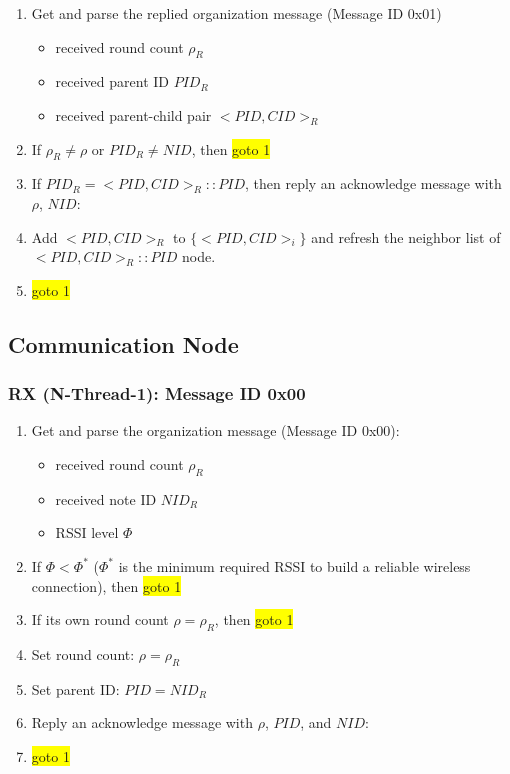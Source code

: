 \documentclass[letterpaper,9pt]{article}
\begin{document}
\begin{enumerate}
	\item Get and parse the replied organization message (Message ID 0x01)
	\begin{itemize}
		\item received round count $\rho_R$
		\item received parent ID $PID_R$
		\item received parent-child pair $<PID,CID>_R$	
	\end{itemize}
		\item If $\rho_R \neq \rho$ or $PID_R \neq NID$, then \colorbox{yellow}{goto 1}
		\item If $PID_R = <PID,CID>_R::PID$, then reply an acknowledge message with $\rho$, $NID$:\\
		\item Add $<PID,CID>_R$ to $\{<PID,CID>_i\}$ and refresh the neighbor list of $<PID,CID>_R::PID$ node.
	\item \colorbox{yellow}{goto 1}	
\end{enumerate}

\subsection{Communication Node}

\subsubsection{RX (N-Thread-1): Message ID 0x00}

\begin{enumerate}
	\item Get and parse the organization message (Message ID 0x00):
	\begin{itemize}
		\item received round count $\rho_R$
		\item received note ID $NID_R$
		\item RSSI level $\Phi$
	\end{itemize}
	\item If $\Phi<\Phi^*$ ($\Phi^*$ is the minimum required RSSI to build a reliable wireless connection), then \colorbox{yellow}{goto 1}
	\item If its own round count $\rho=\rho_R$, then \colorbox{yellow}{goto 1}
		\item Set round count: $\rho=\rho_R$
		\item Set parent ID: $PID=NID_R$
		\item Reply an acknowledge message with $\rho$, $PID$, and $NID$:\\
	\item \colorbox{yellow}{goto 1}
\end{enumerate}
\end{document}
